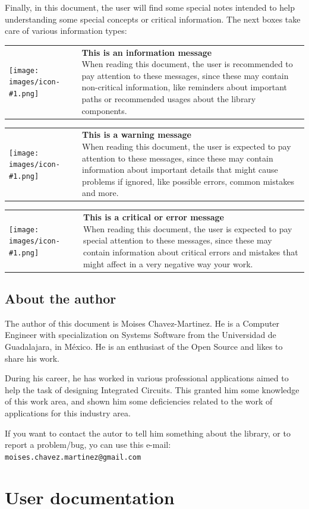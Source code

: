 \documentclass[11pt,twoside,openany,x11names,svgnames]{memoir}
\makeatletter
\newcommand\chapterillustration{}
\newcommand{\IconNote}[3]
{
	\begin{table}[ht]
	\begin{tabular}{ lm{\dimexpr\textwidth-8\tabcolsep-\wd0}@{}}
		\toprule
		\texttt{[image: images/icon-\#1.png]}
		&
		\parbox[t]{155mm}{
		\textbf{#2} \\
		#3
		}
	\end{tabular}
\end{table}
}
\makeatother
\begin{document}
Finally, in this document, the user will find some special notes intended to help understanding some special concepts or critical information. The next boxes take care of various information types:

\IconNote
	{info}
	{This is an information message}
	{When reading this document, the user is recommended to pay attention to these messages, since these may contain non-critical information, like reminders about important paths or recommended usages about the library components.}

\IconNote
	{warning}
	{This is a warning message}
	{When reading this document, the user is expected to pay attention to these messages, since these may contain information about important details that might cause problems if ignored, like possible errors, common mistakes and more.}

\IconNote
	{error}
	{This is a critical or error message}
	{When reading this document, the user is expected to pay special attention to these messages, since these may contain information about critical errors and mistakes that might affect in a very negative way your work.}

\section{About the author}\label{About-The-Author}
 
The author of this document is Moises Chavez-Martinez. He is a Computer Engineer with specialization on Systems Software from the Universidad de Guadalajara, in M\'exico. He is an enthusiast of the Open Source and likes to share his work.

During his career, he has worked in various professional applications aimed to help the task of designing Integrated Circuits. This granted him some knowledge of this work area, and shown him some deficiencies related to the work of applications for this industry area.

If you want to contact the autor to tell him something about the library, or to report a problem/bug, yo can use this e-mail: \texttt{moises.chavez.martinez@gmail.com}

\renewcommand\chapterillustration{images/chapter02-cover}
\chapter{User documentation}\label{User-documentation}
\end{document}
